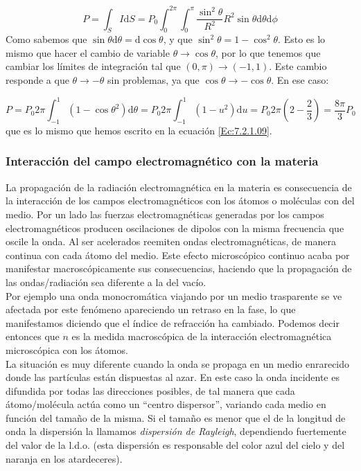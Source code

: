 \documentclass[12pt]{article}
\newcommand{\D}{\mathrm{d}}
\numberwithin{equation}{section}
\numberwithin{figure}{section}
\begin{document}
$$ P = \int_S I \D S = P_0 \int_0^{2 \pi} \int_{0}^\pi \dfrac{\sin^2 \theta}{R^2} R^2 \sin \theta \D \theta \D \phi $$
Como sabemos que $\sin \theta \D \theta = \D \cos \theta$, y que $\sin^2 \theta = 1 - \cos^2 \theta$. Esto es lo mismo que hacer el cambio de variable $\theta \rightarrow \cos \theta $, por lo que tenemos que cambiar los límites de integración tal que $(0,\pi) \rightarrow (-1,1)$. Este cambio responde a que $\theta \rightarrow - \theta$ sin problemas, ya que $\cos \theta \rightarrow - \cos \theta$. En ese caso:

$$ P = P_0 2 \pi \int_{-1}^{1} (1-\cos \theta^2) \D \theta = P_0 2 \pi \int_{-1}^{1} (1-u^2) \D u  = P_0 2 \pi (2-\dfrac{2}{3}) = \dfrac{8 \pi}{3} P_0$$ 
que es lo mismo que hemos escrito en la ecuación \ref{Ec:7.2.1.09}.

\hrulefill

\subsubsection{Interacción del campo electromagnético con la materia}

La propagación de la radiación electromagnética en la materia es consecuencia de la interacción de los campos electromagnéticos con los átomos o moléculas con del medio. Por un lado las fuerzas electromagnéticas generadas por los campos electromagnéticos producen oscilaciones de dipolos con la misma frecuencia que oscile la onda. Al ser acelerados reemiten ondas electromagnéticas, de manera continua con cada átomo del medio. Este efecto microscópico continuo acaba por manifestar macroscópicamente sus consecuencias, haciendo que la propagación de las ondas/radiación sea  diferente a la del vacío. \\

Por ejemplo una onda monocromática viajando por un medio trasparente se ve afectada por este fenómeno apareciendo un retraso en la fase, lo que manifestamos diciendo que el índice de refracción ha cambiado. Podemos decir entonces que $n$ es la medida macroscópica de la interacción electromagnética microscópica con los átomos. \\

La situación es muy diferente cuando la onda se propaga en un medio enrarecido donde las partículas están dispuestas al azar. En este caso la onda incidente es difundida por todas las direcciones posibles, de tal manera que cada átomo/molécula actúa como un ``centro dispersor'', variando cada medio en función del tamaño de la misma. Si el tamaño es menor que el de la longitud de onda la dispersión la llamamos \textit{dispersión de Rayleigh}, dependiendo fuertemente del valor de la l.d.o. (esta dispersión es responsable del color azul del cielo y del naranja en los atardeceres). \\
\end{document}
